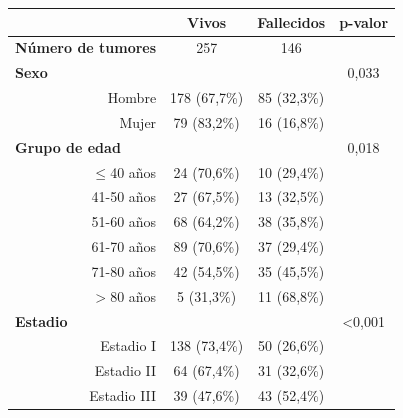 \begin{table}[H]
	\centering
	\begin{tabular}{rccc}
		\cline{2-4}
		\multicolumn{1}{l}{}                              & \textbf{Vivos} & \textbf{Fallecidos} & \textbf{p-valor}     \\ \hline
		\multicolumn{1}{l}{\textbf{Número de tumores}}    & 257            & 146                 & \multicolumn{1}{l}{} \\ \hline
		\multicolumn{1}{l}{\textbf{Sexo}}                 &                &                     & 0,033                \\
		Hombre                                            & 178 (67,7\%)   & 85 (32,3\%)         &                      \\
		Mujer                                             & 79 (83,2\%)    & 16 (16,8\%)         &                      \\ \hline
		\multicolumn{1}{l}{\textbf{Grupo de edad}}        &                &                     & 0,018                \\
		$\leq$40 años                                         & 24 (70,6\%)    & 10 (29,4\%)         &                      \\
		41-50 años                                        & 27 (67,5\%)    & 13 (32,5\%)         &                      \\
		51-60 años                                        & 68 (64,2\%)    & 38 (35,8\%)         &                      \\
		61-70 años                                        & 89 (70,6\%)    & 37 (29,4\%)         &                      \\
		71-80 años                                        & 42 (54,5\%)    & 35 (45,5\%)         &                      \\
		$>$80 años                                   & 5 (31,3\%)     & 11 (68,8\%)         &                      \\ \hline
		\multicolumn{1}{l}{\textbf{Estadio}}              &                &                     & \textless{}0,001     \\
		Estadio I                                         & 138 (73,4\%)   & 50 (26,6\%)         &                      \\
		Estadio II                                        & 64 (67,4\%)    & 31 (32,6\%)         &                      \\
		Estadio III                                       & 39 (47,6\%)    & 43 (52,4\%)         &                      \\

\end{tabular}
\end{table}
